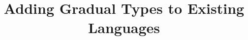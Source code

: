 \documentclass[runningheads]{llncs}
\begin{document}
	
\title{Adding Gradual Types to Existing Languages}
\maketitle

\setcounter{tocdepth}{2}
\tableofcontents







\end{document}
